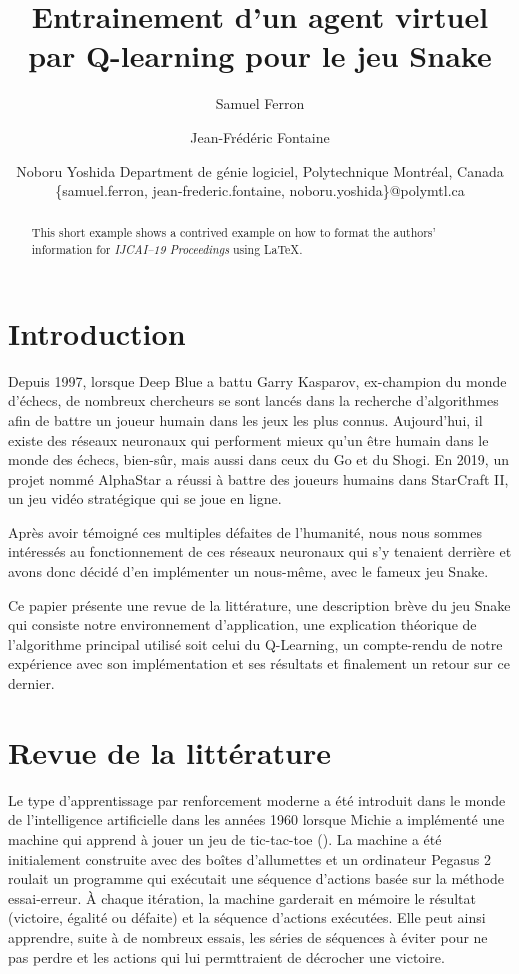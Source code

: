 \documentclass{article}
\title{Entrainement d'un agent virtuel par Q-learning pour le jeu Snake}
\author{
Samuel Ferron\and
Jean-Frédéric Fontaine\and
Noboru Yoshida
\affiliations
Department de génie logiciel, Polytechnique Montréal, Canada\\
\emails
\{samuel.ferron, jean-frederic.fontaine, noboru.yoshida\}@polymtl.ca
}
\begin{document}
\maketitle

\begin{abstract}
This short example shows a contrived example on how to format the authors' information for {\it IJCAI--19 Proceedings} using \LaTeX{}.
\end{abstract}

\section{Introduction}

Depuis 1997, lorsque Deep Blue a battu Garry Kasparov, ex-champion du monde d’échecs, de nombreux chercheurs se sont lancés dans la recherche d’algorithmes afin de battre un joueur humain dans les jeux les plus connus. Aujourd’hui, il existe des réseaux neuronaux qui performent mieux qu’un être humain dans le monde des échecs, bien-sûr, mais aussi dans ceux du Go et du Shogi. En 2019, un projet nommé AlphaStar a réussi à battre des joueurs humains dans StarCraft II, un jeu vidéo stratégique qui se joue en ligne.\linebreak

Après avoir témoigné ces multiples défaites de l’humanité, nous nous sommes intéressés au fonctionnement de ces réseaux neuronaux qui s’y tenaient derrière et avons donc décidé d’en implémenter un nous-même, avec le fameux jeu Snake.\linebreak

Ce papier présente une revue de la littérature, une description brève du jeu Snake qui consiste notre environnement d'application, une explication théorique de l'algorithme principal utilisé soit celui du Q-Learning, un compte-rendu de notre expérience avec son implémentation et ses résultats et finalement un retour sur ce dernier.

\section{Revue de la littérature}
 
Le type d'apprentissage par renforcement moderne a été introduit dans le monde de l'intelligence artificielle dans les années 1960 lorsque Michie a implémenté une machine qui apprend à jouer un jeu de tic-tac-toe (\cite{10.1093/comjnl/6.3.232}). La machine a été initialement construite avec des boîtes d'allumettes et un ordinateur Pegasus 2 roulait un programme qui exécutait une séquence d'actions basée sur la méthode essai-erreur. À chaque itération, la machine garderait en mémoire le résultat (victoire, égalité ou défaite) et la séquence d'actions exécutées. Elle peut ainsi apprendre, suite à de nombreux essais, les séries de séquences à éviter pour ne pas perdre et les actions qui lui permttraient de décrocher une victoire.
\linebreak
\end{document}
